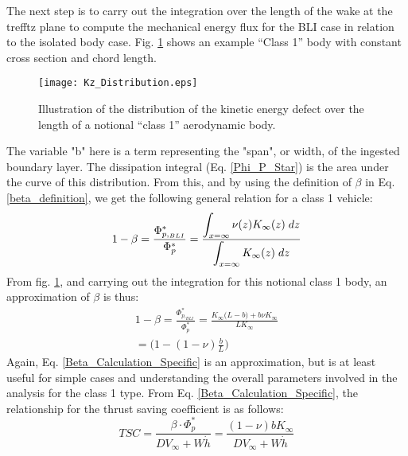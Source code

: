 					The next step is to carry out the integration over the length of the wake at the trefftz plane to compute the mechanical energy flux for the BLI case in relation to the isolated body case.  Fig. \ref{Kz_Distribution} shows an example ``Class 1'' body with constant cross section and chord length.
					\begin{figure}[htp]
						\centering
						\texttt{[image: Kz\_Distribution.eps]}
						\caption{Illustration of the distribution of the kinetic energy defect over the length of a notional ``class 1'' aerodynamic body.}
						\label{Kz_Distribution}
					\end{figure}															
																														
					The variable "b" here is a term representing the "span", or width, of the ingested boundary layer.  The dissipation integral (Eq. \ref{Phi_P_Star}) is the area under the curve of this distribution.  From this, and by using the definition of $\beta$ in Eq. \ref{beta_definition}, we get the following general relation for a class 1 vehicle:
					\begin{equation}
						1 - \beta = \frac{\Phi_{p,_{BLI}}^*}{\Phi_p^*} = {\displaystyle\int_{x = \infty} \nu(z) K_\infty(z) \hspace{1mm} dz \over \displaystyle\int_{x = \infty} K_\infty(z) \hspace{1mm} dz}
						\label{Beta_Calculation_General}
					\end{equation}
					From fig. \ref{Kz_Distribution}, and carrying out the integration for this notional class 1 body, an approximation of $\beta$ is thus:
					\begin{equation}
						\begin{aligned}
							1 - \beta = \frac{ \Phi_{p,_{BLI}}^*}{\Phi_p^*} = \frac{K_\infty \Big(L-b\Big) + b \nu K_\infty}{LK_\infty} \\%
								  = \Big(1 - (1-\nu)\frac{b}{L}\Big)
						\end{aligned}
						\label{Beta_Calculation_Specific}
					\end{equation}
					Again, Eq. \ref{Beta_Calculation_Specific} is an approximation, but is at least useful for simple cases and understanding the overall parameters involved in the analysis for the class 1 type.  From Eq. \ref{Beta_Calculation_Specific}, the relationship for the thrust saving coefficient is as follows:
					\begin{equation}
						TSC = \frac{\beta \cdot \Phi_p^*}{DV_\infty + W\dot{h}} = \frac{(1-\nu) b K_\infty}{DV_\infty + W\dot{h}}
						\label{TSC_Class2}
					\end{equation} 
					
